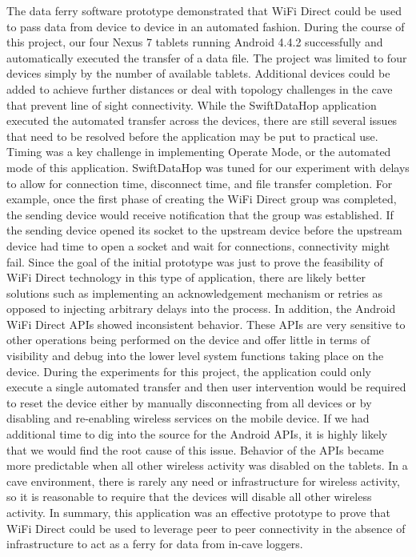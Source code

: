 \documentclass[10pt,twocolumn]{article}
\begin{document}
The data ferry software prototype demonstrated that WiFi Direct could be used to pass data from device to device in an automated fashion. 
During the course of this project, our four Nexus 7 tablets running Android 4.4.2 successfully and automatically executed the transfer of a data file.
The project was limited to four devices simply by the number of available tablets.
Additional devices could be added to achieve further distances or deal with topology challenges in the cave that prevent line of sight connectivity. 
While the SwiftDataHop application executed the automated transfer across the devices, there are still several issues that need to be resolved before the application may be put to practical use.
Timing was a key challenge in implementing Operate Mode, or the automated mode of this application.
SwiftDataHop was tuned for our experiment with delays to allow for connection time, disconnect time, and file transfer completion.
For example, once the first phase of creating the WiFi Direct group was completed, the sending device would receive notification that the group was established.  
If the sending device opened its socket to the upstream device before the upstream device had time to open a socket and wait for connections, connectivity might fail.
Since the goal of the initial prototype was just to prove the feasibility of WiFi Direct technology in this type of application, there are likely better solutions such as implementing an acknowledgement mechanism or retries as opposed to injecting arbitrary delays into the process. 
In addition, the Android WiFi Direct APIs showed inconsistent behavior.
These APIs are very sensitive to other operations being performed on the device and offer little in terms of visibility and debug into the lower level system functions taking place on the device.
During the experiments for this project, the application could only execute a single automated transfer and then user intervention would be required to reset the device either by manually disconnecting from all devices or by disabling and re-enabling wireless services on the mobile device.
If we had additional time to dig into the source for the Android APIs, it is highly likely that we would find the root cause of this issue.
Behavior of the APIs became more predictable when all other wireless activity was disabled on the tablets.
In a cave environment, there is rarely any need or infrastructure for wireless activity, so it is reasonable to require that the devices will disable all other wireless activity.
In summary, this application was an effective prototype to prove that WiFi Direct could be used to leverage peer to peer connectivity in the absence of infrastructure to act as a ferry for data from in-cave loggers.
\end{document}

